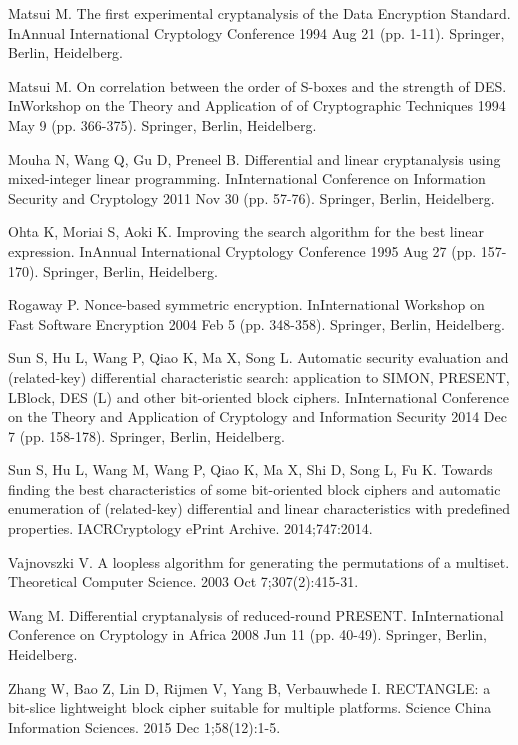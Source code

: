 \begin{thebibliography}{8}
Matsui M. The first experimental cryptanalysis of the Data Encryption Standard. InAnnual International Cryptology Conference 1994 Aug 21 (pp. 1-11). Springer, Berlin, Heidelberg.

Matsui M. On correlation between the order of S-boxes and the strength of DES. InWorkshop on the Theory and Application of of Cryptographic Techniques 1994 May 9 (pp. 366-375). Springer, Berlin, Heidelberg.

Mouha N, Wang Q, Gu D, Preneel B. Differential and linear cryptanalysis using mixed-integer linear programming. InInternational Conference on Information Security and Cryptology 2011 Nov 30 (pp. 57-76). Springer, Berlin, Heidelberg.

Ohta K, Moriai S, Aoki K. Improving the search algorithm for the best linear expression. InAnnual International Cryptology Conference 1995 Aug 27 (pp. 157-170). Springer, Berlin, Heidelberg.

Rogaway P. Nonce-based symmetric encryption. InInternational Workshop on Fast Software Encryption 2004 Feb 5 (pp. 348-358). Springer, Berlin, Heidelberg.

Sun S, Hu L, Wang P, Qiao K, Ma X, Song L. Automatic security evaluation and (related-key) differential characteristic search: application to SIMON, PRESENT, LBlock, DES (L) and other bit-oriented block ciphers. InInternational Conference on the Theory and Application of Cryptology and Information Security 2014 Dec 7 (pp. 158-178). Springer, Berlin, Heidelberg.

Sun S, Hu L, Wang M, Wang P, Qiao K, Ma X, Shi D, Song L, Fu K. Towards finding the best characteristics of some bit-oriented block ciphers and automatic enumeration of (related-key) differential and linear characteristics with predefined properties. IACRCryptology ePrint Archive. 2014;747:2014.

Vajnovszki V. A loopless algorithm for generating the permutations of a multiset. Theoretical Computer Science. 2003 Oct 7;307(2):415-31.

Wang M. Differential cryptanalysis of reduced-round PRESENT. InInternational Conference on Cryptology in Africa 2008 Jun 11 (pp. 40-49). Springer, Berlin, Heidelberg.

Zhang W, Bao Z, Lin D, Rijmen V, Yang B, Verbauwhede I. RECTANGLE: a bit-slice lightweight block cipher suitable for multiple platforms. Science China Information Sciences. 2015 Dec 1;58(12):1-5.


\end{thebibliography}
